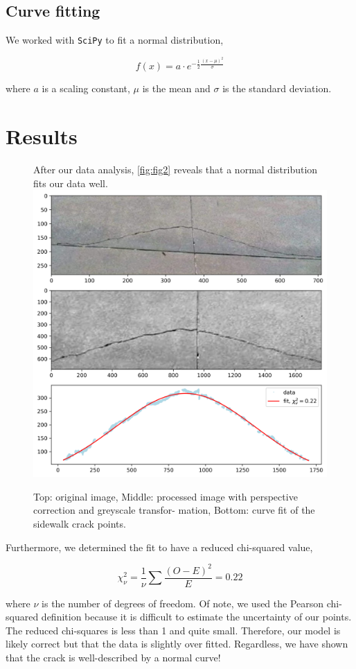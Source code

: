 \documentclass{article}
\begin{document}
\subsection{Curve fitting}
We worked with \texttt{SciPy} \cite{2020SciPy-NMeth} to fit a normal distribution,

\begin{equation}
    f(x)=a \cdot e^{-\frac{1}{2}\frac{(x-\mu)^2}{\sigma}}
\end{equation}

where $a$ is a scaling constant, $\mu$ is the mean and $\sigma$ is the standard deviation.

\section{Results}

\begin{figure}[h]
After our data analysis, \autoref{fig:fig2} reveals that a normal distribution fits our data well.
    \centering
    \includegraphics[width=13cm]{fit.png}
    \caption{Top: original image, Middle: processed image with perspective correction and greyscale transfor- mation, Bottom: curve fit of the sidewalk crack points.}
    \label{fig:fig2}
\end{figure}

Furthermore, we determined the fit to have a reduced chi-squared value,

\begin{equation}
    \chi_{\nu}^2 = \frac{1}{\nu} \sum \frac{(O-E)^2}{E} = 0.22
\end{equation}

where $\nu$ is the number of degrees of freedom. Of note, we used the Pearson chi-squared definition because it is difficult to estimate the uncertainty of our points. \\The reduced chi-squares is less than 1 and quite small. Therefore, our model is likely correct but that the data is slightly over fitted. Regardless, we have shown that the crack is well-described by a normal curve!



\nocite{*}
\end{document}

